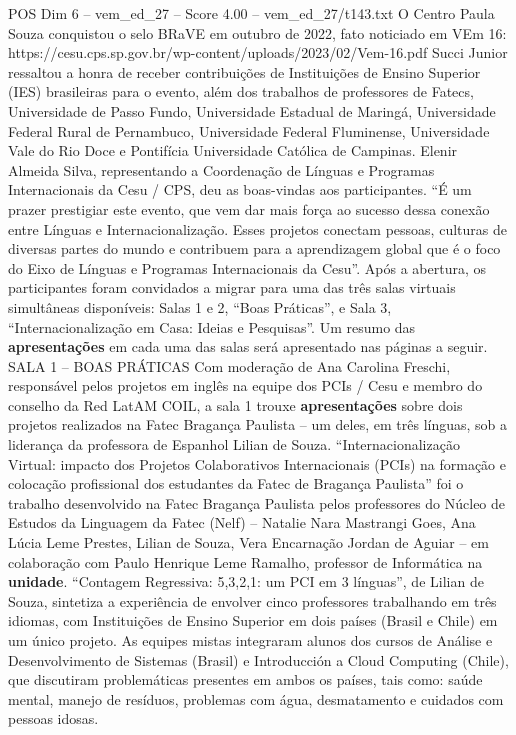 \begin{textsample}{POS Dim 6 – vem\_ed\_27 – Score 4.00 – vem\_ed\_27/t143.txt}
O Centro Paula Souza conquistou o selo BRaVE em outubro de 2022, fato noticiado em VEm 16: https://cesu.cps.sp.gov.br/wp-content/uploads/2023/02/Vem-16.pdf Succi Junior ressaltou a honra de receber contribuições de Instituições de Ensino Superior (IES) brasileiras para o evento, além dos trabalhos de professores de Fatecs, Universidade de Passo Fundo, Universidade Estadual de Maringá, Universidade Federal Rural de Pernambuco, Universidade Federal Fluminense, Universidade Vale do Rio Doce e Pontifícia Universidade Católica de Campinas.
Elenir Almeida Silva, representando a Coordenação de Línguas e Programas Internacionais da Cesu / CPS, deu as boas-vindas aos participantes. “É um prazer prestigiar este evento, que vem dar mais força ao sucesso dessa conexão entre Línguas e Internacionalização.
Esses projetos conectam pessoas, culturas de diversas partes do mundo e contribuem para a aprendizagem global que é o foco do Eixo de Línguas e Programas Internacionais da Cesu”.
Após a abertura, os participantes foram convidados a migrar para uma das três salas virtuais simultâneas disponíveis: Salas 1 e 2, “Boas Práticas”, e Sala 3, “Internacionalização em Casa: Ideias e Pesquisas”.
Um resumo das \textbf{apresentações} em cada uma das salas será apresentado nas páginas a seguir.
SALA 1 – BOAS PRÁTICAS Com moderação de Ana Carolina Freschi, responsável pelos projetos em inglês na equipe dos PCIs / Cesu e membro do conselho da Red LatAM COIL, a sala 1 trouxe \textbf{apresentações} sobre dois projetos realizados na Fatec Bragança Paulista – um deles, em três línguas, sob a liderança da professora de Espanhol Lilian de Souza. “Internacionalização Virtual: impacto dos Projetos Colaborativos Internacionais (PCIs) na formação e colocação profissional dos estudantes da Fatec de Bragança Paulista” foi o trabalho desenvolvido na Fatec Bragança Paulista pelos professores do Núcleo de Estudos da Linguagem da Fatec (Nelf) – Natalie Nara Mastrangi Goes, Ana Lúcia Leme Prestes, Lilian de Souza, Vera Encarnação Jordan de Aguiar – em colaboração com Paulo Henrique Leme Ramalho, professor de Informática na \textbf{unidade}. “Contagem Regressiva: 5,3,2,1: um PCI em 3 línguas”, de Lilian de Souza, sintetiza a experiência de envolver cinco professores trabalhando em três idiomas, com Instituições de Ensino Superior em dois países (Brasil e Chile) em um único projeto.
As equipes mistas integraram alunos dos cursos de Análise e Desenvolvimento de Sistemas (Brasil) e Introducción a Cloud Computing (Chile), que discutiram problemáticas presentes em ambos os países, tais como: saúde mental, manejo de resíduos, problemas com água, desmatamento e cuidados com pessoas idosas.

\end{textsample}
